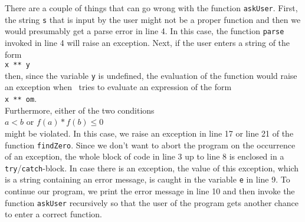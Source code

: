 There are a couple of things that can go wrong with the function \texttt{askUser}.  First,
the string \texttt{s} that is input by the user might not be a proper function and then
we would presumably get a parse error in line 4.  In this case, the function \texttt{parse}
invoked in line 4 will raise an exception. Next, if the user enters a string of the form
\\[0.2cm]
\hspace*{1.3cm}
\texttt{x ** y}
\\[0.2cm]
then, since the variable \texttt{y} is undefined, the evaluation of the function would
raise an exception when \setlx\ tries to evaluate an expression of the form
\\[0.2cm]
\hspace*{1.3cm}
\texttt{x ** om}.
\\[0.2cm]
Furthermore, either of the two conditions
\\[0.2cm]
\hspace*{1.3cm}
$a < b$ \quad or \quad $f(a) * f(b) \leq 0$
\\[0.2cm]
might be violated.  In this case, we raise an exception in line 17 or
line 21 of the function \texttt{findZero}.  
Since we don't want to abort the program on the occurrence of an exception, the whole block of
code in line 3 up to line 8 is enclosed in a \texttt{try}/\texttt{catch}-block.  In case there is
an exception, the value of this exception, which is a string containing an error message, is
caught in the variable \texttt{e} in line 9.  To continue our program, we print the error message
in line 10 and then invoke the function \texttt{askUser} recursively so that the user of
the program gets another chance to enter a correct function.

